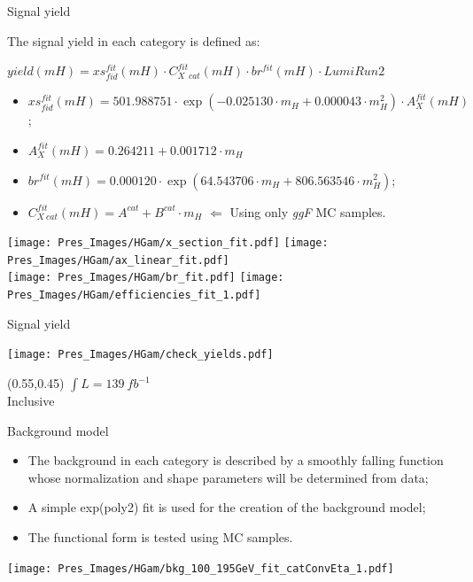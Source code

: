 \documentclass[10pt,UKenglish, leqno, xcolor = dvipsnames]{beamer}
\begin{document}
	\begin{frame}{Signal yield}
		\vfill
		\begin{scriptsize}
			The signal yield in each category is defined as:
			\begin{center}
				$yield(mH) = xs_{fid}^{fit}(mH) \cdot C_{X\ \ cat}^{fit}(mH) \cdot br^{fit}(mH) \cdot LumiRun2$
			\end{center}
			\begin{itemize}
				\item $xs_{fid}^{fit}(mH) = 501.988751\cdot\exp(-0.025130\cdot m_{H} + 0.000043\cdot m_{H}^2) \cdot A_X^{fit}(mH)$;
				\item $A_X^{fit}(mH) = 0.264211 + 0.001712\cdot m_H$ 
				\item $br^{fit}(mH) = 0.000120\cdot\exp(64.543706\cdot m_{H} + 806.563546\cdot m_{H}^2)$;
				\item $C^{fit}_{X\ cat}(mH) = A^{cat} + B^{cat}\cdot m_{H}$ $\Leftarrow$ Using only \textit{ggF} MC samples.
				
			\end{itemize}
		\end{scriptsize}
		
		\vspace{.1cm}
		\centering
		\texttt{[image: Pres\_Images/HGam/x\_section\_fit.pdf]}
		\texttt{[image: Pres\_Images/HGam/ax\_linear\_fit.pdf]}\\
		\texttt{[image: Pres\_Images/HGam/br\_fit.pdf]}
		\texttt{[image: Pres\_Images/HGam/efficiencies\_fit\_1.pdf]}
		
		
		\vfill
	\end{frame}
	
	\begin{frame}{Signal yield}
		\vfill
		\begin{center}
			\texttt{[image: Pres\_Images/HGam/check\_yields.pdf]}
		\end{center}
		\begin{textblock}{1}(0.55,0.45)
			$\int L = 139\ fb^{-1}$\\
			Inclusive
		\end{textblock}
		\vfill
	\end{frame}
	
	\begin{frame}{Background model}
		\vfill
		\begin{itemize}
			\item The background in each category is described by a smoothly falling function whose normalization and shape parameters will be determined from data;
			\item A simple exp(poly2) fit is used for the creation of the background model;
			\item The functional form is tested using MC samples.
		\end{itemize}
		\begin{center}
			\texttt{[image: Pres\_Images/HGam/bkg\_100\_195GeV\_fit\_catConvEta\_1.pdf]}
		\end{center}
		\vfill
	\end{frame}
\end{document}
